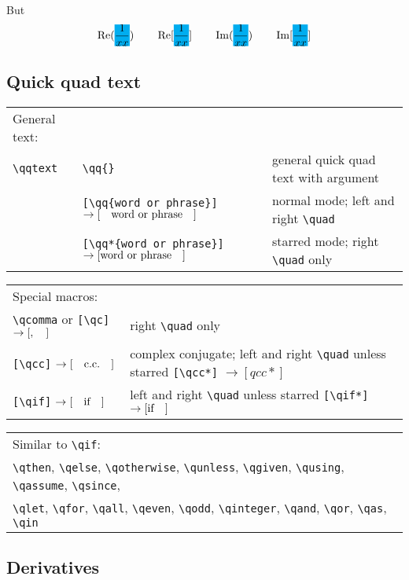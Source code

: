 \documentclass{article}
\def\phantom#1{#1}
\newcommand{\cbox}[2][cyan]
{\mathchoice
	{\setlength{\fboxsep}{0pt}\colorbox{#1}{$\displaystyle#2$}}
	{\setlength{\fboxsep}{0pt}\colorbox{#1}{$\textstyle#2$}}
	{\setlength{\fboxsep}{0pt}\colorbox{#1}{$\scriptstyle#2$}}
	{\setlength{\fboxsep}{0pt}\colorbox{#1}{$\scriptscriptstyle#2$}}
}
\newcommand{\grande}{\cbox{\phantom{\frac{1}{xx}}}}
\begin{document}
But
  \[ \Re(\grande)
    \qquad \Re[\grande]
    \qquad \Im(\grande)
    \qquad \Im[\grande]
\]

\subsection{Quick quad text}

\begin{tabular}[l]{ l l p{6cm} }
General text: & & \\
\verb|\qqtext| & \verb|\qq{}| & general quick quad text with argument \\
& \verb|[\qq{word or phrase}]| $\rightarrow[\qq{word or phrase}]$ & normal mode; left and right \verb|\quad| \\
& \verb|[\qq*{word or phrase}]| $\rightarrow[\qq*{word or phrase}]$ & starred mode; right \verb|\quad| only
\end{tabular}

\begin{longtable}[l]{ l l }
Special macros: & \\
\verb|\qcomma| or \verb|[\qc]| $\rightarrow[\qc]$ & right \verb|\quad| only \\
\verb|[\qcc]| $\rightarrow[\qcc]$ & complex conjugate; left and right \verb|\quad| unless starred \verb|[\qcc*]| $\rightarrow[qcc*]$ \\
\verb|[\qif]| $\rightarrow[\qif]$ & left and right \verb|\quad| unless starred \verb|[\qif*]| $\rightarrow[\qif*]$
\end{longtable}
\begin{longtable}[l]{ l }
Similar to \verb|\qif|: \\
\verb|\qthen|, \verb|\qelse|, \verb|\qotherwise|, \verb|\qunless|, \verb|\qgiven|, \verb|\qusing|, \verb|\qassume|, \verb|\qsince|, \\
\verb|\qlet|, \verb|\qfor|, \verb|\qall|, \verb|\qeven|, \verb|\qodd|, \verb|\qinteger|, \verb|\qand|, \verb|\qor|, \verb|\qas|, \verb|\qin|
\end{longtable}

\subsection{Derivatives}
\end{document}
